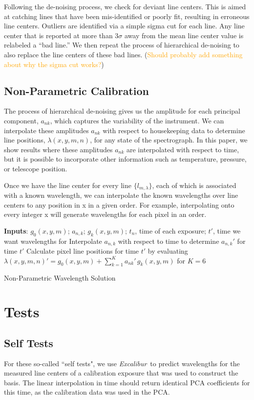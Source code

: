 \documentclass[twocolumn]{aastex63}
\newcommand{\lz}[1]{\textcolor{orange}{#1}}
\newcommand{\project}[1]{\textsl{#1}}
\newcommand{\name}{\project{Excalibur}}
\begin{document}
Following the de-noising process, we check for deviant line centers.  This is aimed at catching lines that have been mis-identified or poorly fit, resulting in erroneous line centers.  Outliers are identified via a simple sigma cut for each line.  Any line center that is reported at more than $3\sigma$ away from the mean line center value is relabeled a ``bad line.''  We then repeat the process of hierarchical de-noising to also replace the line centers of these bad lines. (\lz{Should probably add something about why the sigma cut works?})

\subsection{Non-Parametric Calibration} \label{sec:nonparam}
The process of hierarchical de-noising gives us the amplitude for each principal component, $a_{nk}$, which captures the variability of the instrument.  We can interpolate these amplitudes $a_{nk}$ with respect to housekeeping data to determine line positions, $\lambda(x,y,m,n)$, for any state of the spectrograph.  In this paper, we show results where these amplitudes $a_{nk}$ are interpolated with respect to time, but it is possible to incorporate other information such as temperature, pressure, or telescope position.

Once we have the line center for every line $\{l_{m,\lambda}\}$, each of which is associated with a known wavelength, we can interpolate  the known wavelengths over line centers to any position in x in a given order.  For example, interpolating onto every integer x will generate wavelengths for each pixel in an order.
\begin{algorithm}
\SetAlgoLined
\textbf{Inputs}: $g_0(x,y,m)$; $a_{n,k}$; $g_k(x,y,m)$; $t_n$, time of each exposure; $t'$, time we want wavelengths for\;
Interpolate $a_{n,k}$ with respect to time to determine $a_{n,k}'$ for time $t'$\;
Calculate pixel line positions for time $t'$ by evaluating\;
$\lambda(x,y,m,n)' = g_0(x,y,m) + \sum_{k=1}^K a_{nk}'\,g_k(x,y,m)$ for $K=6$\;
\caption{Non-Parametric Wavelength Solution}
\end{algorithm}

\section{Tests}
\subsection{Self Tests} \label{sec:test-self}
For these so-called ``self tests", we use \name\ to  predict wavelengths for the measured line centers of a calibration exposure that was used to construct the basis.  The linear interpolation in time should return identical PCA coefficients for this time, as the calibration data was used in the PCA.
\end{document}
